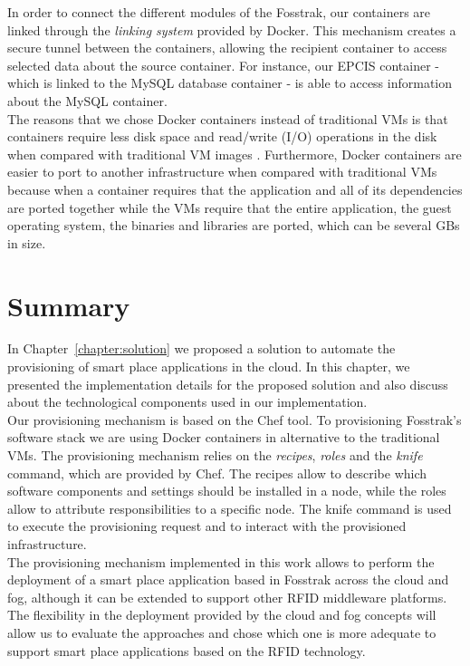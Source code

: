 In order to connect the different modules of the Fosstrak, our containers are
linked through the \textit{linking system} provided by Docker. This mechanism creates a secure tunnel
between the containers, allowing the recipient container to access selected data about the source container.
For instance, our \gls{EPCIS} container - which is linked to the MySQL database container - is able to
access information about the MySQL container.\\

The reasons that we chose Docker containers instead of traditional \glspl{VM} is that containers
require less disk space and read/write (I/O) operations in the disk when compared with traditional
\gls{VM} images \cite{merkel2014docker}. Furthermore, Docker containers are easier to port to another
infrastructure when compared with traditional \glspl{VM} because when a container requires that the
application and all of its dependencies are ported together while the \glspl{VM} require that the
entire application, the guest operating system, the binaries and libraries are ported, which can be
several \glspl{GB} in size.

\section{Summary}
\label{sec:impl_summary}
In Chapter~\ref{chapter:solution} we proposed a solution to automate the provisioning of smart place
applications in the cloud. In this chapter, we presented the implementation details for the proposed
solution and also discuss about the technological components used in our implementation.\\

Our provisioning mechanism is based on the Chef tool. To provisioning Fosstrak's software stack we are
using Docker containers in alternative to the traditional \glspl{VM}. The provisioning mechanism relies
on the \textit{recipes}, \textit{roles} and the \textit{knife} command, which are provided by Chef.
The recipes allow to describe which software components and settings should be installed in a node,
while the roles allow to attribute responsibilities to a specific node. The knife command is used
to execute the provisioning request and to interact with the provisioned infrastructure.\\

The provisioning mechanism implemented in this work allows to perform the deployment of a smart place
application based in Fosstrak across the cloud and fog, although it can be extended to support other
\gls{RFID} middleware platforms. The flexibility in the deployment provided by the cloud and fog
concepts will allow us to evaluate the approaches and chose which one is more adequate to support smart
place applications based on the \gls{RFID} technology.

